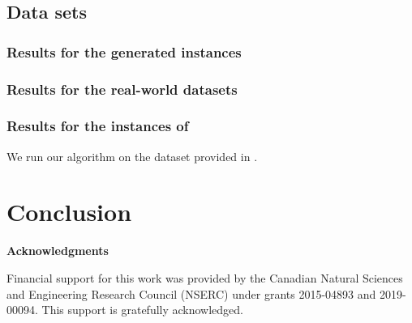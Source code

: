 \documentclass{article}
\begin{document}
\subsection{Data sets}

\subsubsection{ Results for the generated instances}



\subsubsection{ Results for the real-world datasets}
\subsubsection{ Results for the instances of \cite{kinable2014concrete}}

We run our algorithm on the dataset provided in \cite{kinable2014concrete}.

\section{Conclusion}
\label{concl}

\vspace{0.1in}


\vspace{1.5cm} \noindent \textbf{Acknowledgments}

Financial support for this work was provided by the Canadian Natural Sciences and Engineering Research Council (NSERC) under grants 2015-04893 and 2019-00094. This support is gratefully acknowledged.




\end{document}
